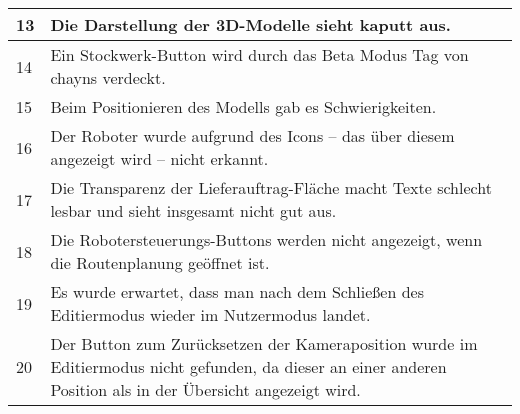 \begin{table}[H]
\begin{tabular}{l|l}
        13          & \multicolumn{1}{p{12cm}}{Die Darstellung der 3D-Modelle sieht kaputt aus.} \\ \hline
        14          & \multicolumn{1}{p{12cm}}{Ein Stockwerk-Button wird durch das Beta Modus Tag von chayns verdeckt.} \\ \hline
        15          & \multicolumn{1}{p{12cm}}{Beim Positionieren des Modells gab es Schwierigkeiten.} \\ \hline
        16          & \multicolumn{1}{p{12cm}}{Der Roboter wurde aufgrund des Icons – das über diesem angezeigt wird – nicht erkannt.} \\ \hline
        17          & \multicolumn{1}{p{12cm}}{Die Transparenz der Lieferauftrag-Fläche macht Texte schlecht lesbar und sieht insgesamt nicht gut aus.} \\ \hline
        18          & \multicolumn{1}{p{12cm}}{Die Robotersteuerungs-Buttons werden nicht angezeigt, wenn die Routenplanung geöffnet ist.} \\ \hline
        19          & \multicolumn{1}{p{12cm}}{Es wurde erwartet, dass man nach dem Schließen des Editiermodus wieder im Nutzermodus landet.} \\ \hline
        20          & \multicolumn{1}{p{12cm}}{Der Button zum Zurücksetzen der Kameraposition wurde im Editiermodus nicht gefunden, da dieser an einer anderen Position als in der Übersicht angezeigt wird.} \\
    \end{tabular}
\end{table}
